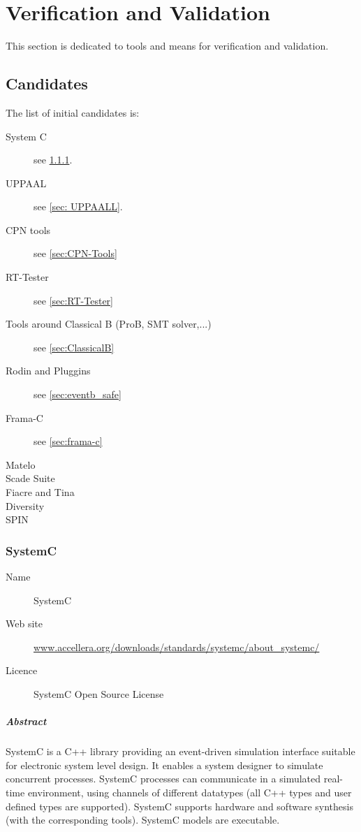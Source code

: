 

\chapter{Verification and Validation}
\label{sec:VnV}

This section is dedicated to tools and means for verification and validation.

\section{Candidates}


The list of initial candidates is:

\begin{description}

\item [System C] see \ref{sec:systemC}.
\item [UPPAAL] see \ref{sec: UPPAALL}.
\item [CPN tools] see \ref{sec:CPN-Tools}
\item [RT-Tester] see \ref{sec:RT-Tester}
\item [Tools around Classical B (ProB, SMT solver,...)] see \ref{sec:ClassicalB}
\item [Rodin and Pluggins] see \ref{sec:eventb_safe}
\item [Frama-C] see \ref{sec:frama-c}
\item [Matelo]
\item [Scade Suite]
\item [Fiacre and Tina]
\item [Diversity]
\item [SPIN]
\end{description}

\subsection{SystemC}
\label{sec:systemC}

\begin{description}
\item[Name] SystemC
\item[Web site] \url{www.accellera.org/downloads/standards/systemc/about_systemc/}
\item[Licence] SystemC Open Source License
\end{description}

\paragraph{Abstract} SystemC is a C++ library providing an event-driven simulation interface suitable for electronic system level design. It enables a system designer to simulate concurrent processes. SystemC processes can communicate in a simulated real-time environment, using channels of different datatypes (all C++ types and user defined types are supported). SystemC supports hardware and software synthesis (with the corresponding tools). SystemC models are executable.

